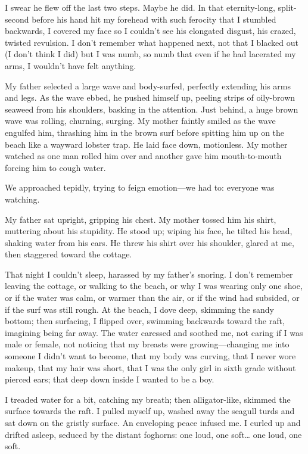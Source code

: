I swear he flew off the last two steps. Maybe he did. In that
eternity-long, split-second before his hand hit my forehead with such
ferocity that I stumbled backwards, I covered my face so I couldn't see
his elongated disgust, his crazed, twisted revulsion. I don't remember
what happened next, not that I blacked out (I don't think I did) but I
was numb, so numb that even if he had lacerated my arms, I wouldn't have
felt anything.

My father selected a large wave and body-surfed, perfectly extending his
arms and legs. As the wave ebbed, he pushed himself up, peeling strips
of oily-brown seaweed from his shoulders, basking in the attention. Just
behind, a huge brown wave was rolling, churning, surging. My mother
faintly smiled as the wave engulfed him, thrashing him in the brown surf
before spitting him up on the beach like a wayward lobster trap. He laid
face down, motionless. My mother watched as one man rolled him over and
another gave him mouth-to-mouth forcing him to cough water.

We approached tepidly, trying to feign emotion---we had to: everyone was
watching.

My father sat upright, gripping his chest. My mother tossed him his
shirt, muttering about his stupidity. He stood up; wiping his face, he
tilted his head, shaking water from his ears. He threw his shirt over
his shoulder, glared at me, then staggered toward the cottage.

That night I couldn't sleep, harassed by my father's snoring. I don't
remember leaving the cottage, or walking to the beach, or why I was
wearing only one shoe, or if the water was calm, or warmer than the air,
or if the wind had subsided, or if the surf was still rough. At the
beach, I dove deep, skimming the sandy bottom; then surfacing, I flipped
over, swimming backwards toward the raft, imagining being far away. The
water caressed and soothed me, not caring if I was male or female, not
noticing that my breasts were growing---changing me into someone I
didn't want to become, that my body was curving, that I never wore
makeup, that my hair was short, that I was the only girl in sixth grade
without pierced ears; that deep down inside I wanted to be a boy.

I treaded water for a bit, catching my breath; then alligator-like,
skimmed the surface towards the raft. I pulled myself up, washed away
the seagull turds and sat down on the gristly surface. An enveloping
peace infused me. I curled up and drifted asleep, seduced by the distant
foghorns: one loud, one soft\ldots{} one loud, one soft.


